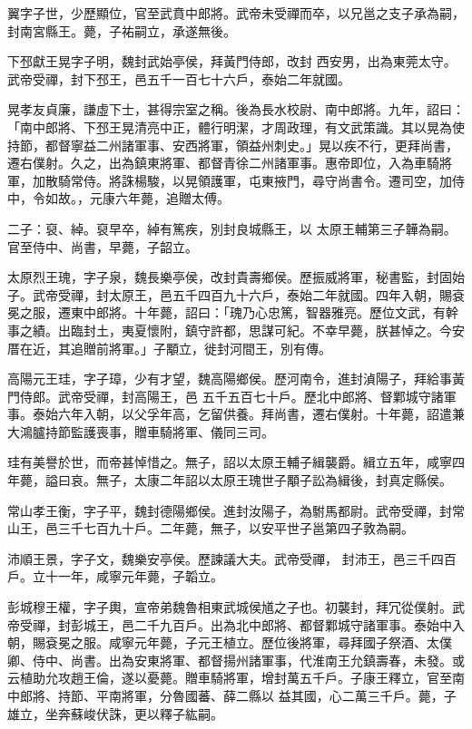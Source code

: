 \begin{pinyinscope}
 翼字子世，少歷顯位，官至武賁中郎將。武帝未受禪而卒，以兄邕之支子承為嗣，封南宮縣王。薨，子祐嗣立，承遂無後。



 下邳獻王晃字子明，魏封武始亭侯，拜黃門侍郎，改封
 西安男，出為東莞太守。武帝受禪，封下邳王，邑五千一百七十六戶，泰始二年就國。



 晃孝友貞廉，謙虛下士，甚得宗室之稱。後為長水校尉、南中郎將。九年，詔曰：「南中郎將、下邳王晃清亮中正，體行明潔，才周政理，有文武策識。其以晃為使持節，都督寧益二州諸軍事、安西將軍，領益州刺史。」晃以疾不行，更拜尚書，遷右僕射。久之，出為鎮東將軍、都督青徐二州諸軍事。惠帝即位，入為車騎將軍，加散騎常侍。將誅楊駿，以晃領護軍，屯東掖門，尋守尚書令。遷司空，加侍中，令如故。，元康六年薨，追贈太傅。



 二子：裒、綽。裒早卒，綽有篤疾，別封良城縣王，以
 太原王輔第三子韡為嗣。官至侍中、尚書，早薨，子韶立。



 太原烈王瑰，字子泉，魏長樂亭侯，改封貴壽鄉侯。歷振威將軍，秘書監，封固始子。武帝受禪，封太原王，邑五千四百九十六戶，泰始二年就國。四年入朝，賜袞冕之服，遷東中郎將。十年薨，詔曰：「瑰乃心忠篤，智器雅亮。歷位文武，有幹事之績。出臨封土，夷夏懷附，鎮守許都，思謀可紀。不幸早薨，朕甚悼之。今安厝在近，其追贈前將軍。」子顒立，徙封河間王，別有傳。



 高陽元王珪，字子璋，少有才望，魏高陽鄉侯。歷河南令，進封湞陽子，拜給事黃門侍郎。武帝受禪，封高陽王，邑
 五千五百七十戶。歷北中郎將、督鄴城守諸軍事。泰始六年入朝，以父孚年高，乞留供養。拜尚書，遷右僕射。十年薨，詔遣兼大鴻臚持節監護喪事，贈車騎將軍、儀同三司。



 珪有美譽於世，而帝甚悼惜之。無子，詔以太原王輔子緝襲爵。緝立五年，咸寧四年薨，謚曰哀。無子，太康二年詔以太原王瑰世子顒子訟為緝後，封真定縣侯。



 常山孝王衡，字子平，魏封德陽鄉侯。進封汝陽子，為駙馬都尉。武帝受禪，封常山王，邑三千七百九十戶。二年薨，無子，以安平世子邕第四子敦為嗣。



 沛順王景，字子文，魏樂安亭侯。歷諫議大夫。武帝受禪，
 封沛王，邑三千四百戶。立十一年，咸寧元年薨，子韜立。



 彭城穆王權，字子輿，宣帝弟魏魯相東武城侯馗之子也。初襲封，拜冗從僕射。武帝受禪，封彭城王，邑二千九百戶。出為北中郎將、都督鄴城守諸軍事。泰始中入朝，賜袞冕之服。咸寧元年薨，子元王植立。歷位後將軍，尋拜國子祭酒、太僕卿、侍中、尚書。出為安東將軍、都督揚州諸軍事，代淮南王允鎮壽春，未發。或云植助允攻趙王倫，遂以憂薨。贈車騎將軍，增封萬五千戶。子康王釋立，官至南中郎將、持節、平南將軍，分魯國蕃、薛二縣以
 益其國，心二萬三千戶。薨，子雄立，坐奔蘇峻伏誅，更以釋子紘嗣。




\end{pinyinscope}
